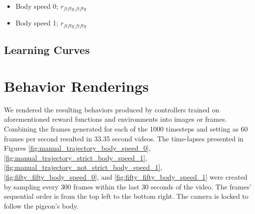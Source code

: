 \begin{itemize}
    \item Body speed 0; $r_{fifty\_fifty}$

    \item Body speed 1; $r_{fifty\_fifty}$

  \end{itemize}

\subsection{Learning Curves}



\section{Behavior Renderings}
  We rendered the resulting behaviors produced by controllers trained on aforementioned reward functions and environments into images or frames.
  Combining the frames generated for each of the 1000 timesteps and setting as 60 frames per second resulted in 33.35 second videos.
  The time-lapses presented in Figures \ref{fig:manual_trajectory_body_speed_0}, \ref{fig:manual_trajectory_strict_body_speed_1}, \ref{fig:manual_trajectory_not_strict_body_speed_1}, \ref{fig:fifty_fifty_body_speed_0}, and \ref{fig:fifty_fifty_body_speed_1} were created by sampling every $300$ frames within the last 30 seconds of the video.
  The frames' sequential order is from the top left to the bottom right.
  The camera is locked to follow the pigeon's body.

